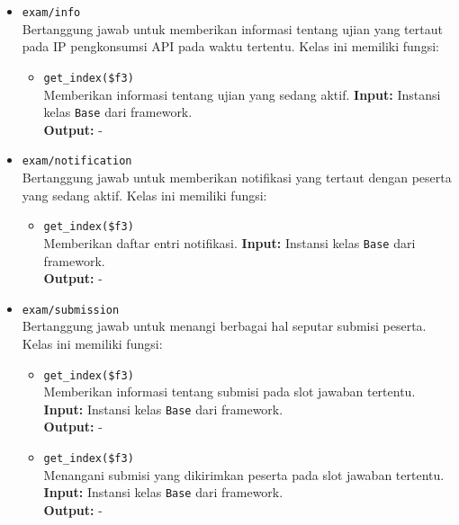 \begin{itemize}
        \item \texttt{exam/info} \\
            Bertanggung jawab untuk memberikan informasi tentang ujian yang tertaut
            pada IP pengkonsumsi API pada waktu tertentu.
            Kelas ini memiliki fungsi:
            \begin{itemize}
                \item \texttt{get\_index(\$f3)} \\
                    Memberikan informasi tentang ujian yang sedang aktif.
                    \textbf{Input:} Instansi kelas \texttt{Base} dari framework.\\
                    \textbf{Output:} -\\
            \end{itemize}
            
        \item \texttt{exam/notification} \\
            Bertanggung jawab untuk memberikan notifikasi yang tertaut dengan
            peserta yang sedang aktif.
            Kelas ini memiliki fungsi:
            \begin{itemize}
                \item \texttt{get\_index(\$f3)} \\
                    Memberikan daftar entri notifikasi.
                    \textbf{Input:} Instansi kelas \texttt{Base} dari framework.\\
                    \textbf{Output:} -\\
            \end{itemize}
            
        \item \texttt{exam/submission} \\
            Bertanggung jawab untuk menangi berbagai hal seputar submisi peserta.
            Kelas ini memiliki fungsi:
            \begin{itemize}
                \item \texttt{get\_index(\$f3)} \\
                    Memberikan informasi tentang submisi pada slot jawaban tertentu.
                    \textbf{Input:} Instansi kelas \texttt{Base} dari framework.\\
                    \textbf{Output:} -\\
                    
                \item \texttt{get\_index(\$f3)} \\
                    Menangani submisi yang dikirimkan peserta pada slot jawaban tertentu.
                    \textbf{Input:} Instansi kelas \texttt{Base} dari framework.\\
                    \textbf{Output:} -\\
            \end{itemize}
            

\end{itemize}
